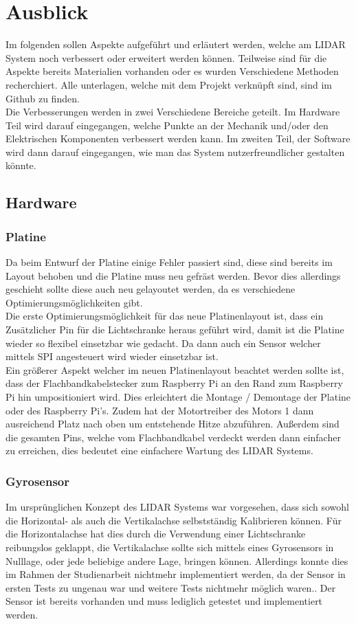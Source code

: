 \chapter{Ausblick}
Im folgenden sollen Aspekte aufgeführt und erläutert werden, welche am \ac{LIDAR} System noch verbessert oder erweitert werden können. Teilweise sind für die Aspekte bereits Materialien vorhanden oder es wurden Verschiedene Methoden recherchiert. Alle unterlagen, welche mit dem Projekt verknüpft sind, sind im Github zu finden.\\
Die Verbesserungen werden in zwei Verschiedene Bereiche geteilt. Im Hardware Teil wird darauf eingegangen, welche Punkte an der Mechanik und/oder den Elektrischen Komponenten verbessert werden kann. Im zweiten Teil, der Software wird dann darauf eingegangen, wie man das System nutzerfreundlicher gestalten könnte.  
\section{Hardware}
\subsection{Platine}
Da beim Entwurf der Platine einige Fehler passiert sind, diese sind bereits im Layout behoben und die Platine muss neu gefräst werden. Bevor dies allerdings geschieht sollte diese auch neu gelayoutet werden, da es verschiedene Optimierungsmöglichkeiten gibt. \\
Die erste Optimierungsmöglichkeit für das neue Platinenlayout ist, dass ein Zusätzlicher Pin für die Lichtschranke heraus geführt wird, damit ist die Platine wieder so flexibel einsetzbar wie gedacht. Da dann auch ein Sensor welcher mittels \ac{SPI} angesteuert wird wieder einsetzbar ist.\\
Ein größerer Aspekt welcher im neuen Platinenlayout beachtet werden sollte ist, dass der Flachbandkabelstecker zum Raspberry Pi an den Rand zum Raspberry Pi hin umpositioniert wird. Dies erleichtert die Montage / Demontage der Platine oder des Raspberry Pi's. Zudem hat der Motortreiber des Motors 1 dann ausreichend Platz nach oben um entstehende Hitze abzuführen. Außerdem sind die gesamten Pins, welche vom Flachbandkabel verdeckt werden dann einfacher zu erreichen, dies bedeutet eine einfachere Wartung des \ac{LIDAR} Systems.
\subsection{Gyrosensor}
Im ursprünglichen Konzept des \ac{LIDAR} Systems war vorgesehen, dass sich sowohl die Horizontal- als auch die Vertikalachse selbstständig Kalibrieren können. Für die Horizontalachse hat dies durch die Verwendung einer Lichtschranke reibungslos geklappt, die Vertikalachse sollte sich mittels eines Gyrosensors in Nulllage, oder jede beliebige andere Lage, bringen können. Allerdings konnte dies im Rahmen der Studienarbeit nichtmehr implementiert werden, da der Sensor in ersten Tests zu ungenau war und weitere Tests nichtmehr möglich waren.. Der Sensor  ist bereits vorhanden und muss lediglich getestet und implementiert werden.
